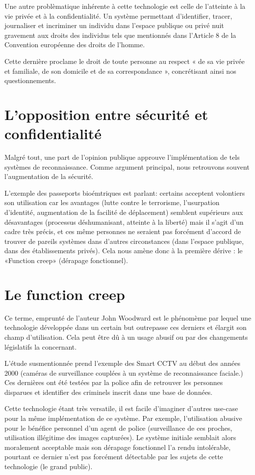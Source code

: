 Une autre problèmatique inhérente à cette technologie est celle de l’atteinte à la vie privée et à la confidentialité.
Un système permettant d’identifier, tracer, journaliser et incriminer un individu dans l’espace publique ou privé
nuit gravement aux droits des individus tels que mentionnés dans l’Article 8 de la Convention européenne des droits
de l’homme.

Cette dernière proclame le droit de toute personne au respect « de sa vie privée et familiale, de son domicile et de
sa correspondance », concrétisant ainsi nos questionnements.

\section{L’opposition entre sécurité et confidentialité}
Malgré tout, une part de l’opinion publique approuve l’implémentation de tels systèmes de reconnaissance.
Comme argument principal, nous retrouvons souvent l’augmentation de la sécurité.

L’exemple des passeports bioémtriques est parlant: certains acceptent volontiers son utilisation car les avantages
(lutte contre le terrorisme, l’usurpation d’identité, augmentation de la facilité de déplacement) semblent
supérieurs aux désavantages (processus déshumanisant, atteinte à la liberté) mais il s’agit d’un cadre très précis, et
ces même personnes ne seraient pas forcément d’accord de trouver de pareils systèmes dans d’autres
circonstances (dans l’espace publique, dans des établissements privés). Cela nous amène donc à la première dérive
: le «Function creep» (dérapage fonctionnel).

\section{Le function creep}
Ce terme, emprunté de l’auteur John Woodward est le phénomème par lequel une technologie développée dans
un certain but outrepasse ces derniers et élargit son champ d’utilisation. Cela peut être dû à un usage abusif ou
par des changements législatifs la concernant.

L’étude susmentionnée prend l’exemple des Smart CCTV au début des années 2000 (caméras de surveillance
couplées à un système de reconnaissance faciale.) Ces dernières ont été testées par la police afin de retrouver les
personnes disparues et identifier des criminels inscrit dans une base de données.

Cette technologie étant très versatile, il est facile d’imaginer d’autres use-case pour la même implémentation de
ce système. Par exemple, l’utilisation abusive pour le bénéfice personnel d’un agent de police (surveillance de ces
proches, utilisation illégitime des images capturées). Le système initiale semblait alors moralement acceptable mais
son dérapage fonctionnel l’a rendu intolérable, pourtant ce dernier n’est pas forcément détectable par les sujets
de cette technologie (le grand public).

